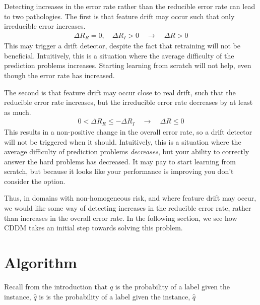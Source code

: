 Detecting increases in the error rate rather than the reducible error rate can lead to two pathologies. The first is that feature drift may occur such that only irreducible error increases. 
\begin{align}
    \Delta R_R = 0, \quad \Delta R_I > 0 \quad \rightarrow \quad \Delta R > 0
\end{align}
This may trigger a drift detector, despite the fact that retraining will not be beneficial. Intuitively, this is a situation where the average difficulty of the prediction problems increases. Starting learning from scratch will not help, even though the error rate has increased.

The second is that feature drift may occur close to real drift, such that the reducible error rate increases, but the irreducible error rate decreases by at least as much. 
\begin{align}
    0 < \Delta R_R \le - \Delta R_I \quad \rightarrow \quad \Delta R \le 0
\end{align}
This results in a non-positive change in the overall error rate, so a drift detector will not be triggered when it should. Intuitively, this is a situation where the average difficulty of prediction problems {\it decreases}, but your ability to correctly answer the hard problems has decreased. It may pay to start learning from scratch, but because it looks like your performance is improving you don't consider the option.

Thus, in domains with non-homogeneous risk, and where feature drift may occur, we would like some way of detecting increases in the reducible error rate, rather than increases in the overall error rate. In the following section, we see how CDDM takes an initial step towards solving this problem.


\section{Algorithm} \label{CDDM:algorithm}

Recall from the introduction that $q$ is the probability of a label given the instance, $\hat{q}$ is is the probability of a label given the instance, $\hat{q}$


